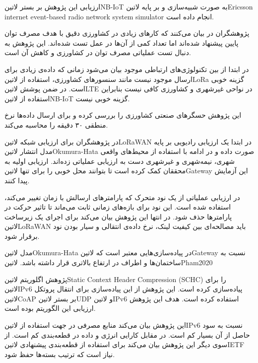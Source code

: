 ارزیابی این پژوهش بر بستر ‌لاتین{NB-IoT} به صورت شبیه‌سازی و بر پایه ‌لاتین{Ericsson internet event-based radio network system simulator} انجام داده است.


پژوهشگران در  بیان می‌کنند که کارهای زیادی در کشاورزی دقیق با هدف مصرف توان پایین پیشنهاد شده‌اند اما تعداد کمی از آن‌ها در عمل تست شده‌اند.
این پژوهش به دنبال تست عملیاتی مصرف توان در کشاورزی و کاهش آن است.

در ابتدا از بین تکنولوژی‌های ارتباطی موجود بیان می‌شود زمانی که داده‌ی زیادی برای ارسال موجود نیست مانند سنسورهای کشاورزی، استفاده از ‌لاتین{LoRa} گزینه خوبی است.
در ضمن پوشش ‌لاتین{LTE} در نواحی غیرشهری و کشاورزی کافی نیست بنابراین استفاده از ‌لاتین{NB-IoT} گزینه خوبی نیست.

این پژوهش حسگرهای صنعتی کشاورزی را بررسی کرده و برای ارسال داده‌ها نرخ منطقی ۳۰ دقیقه را محاسبه می‌کند.


در  پژوهشگران برای ارزیابی شبکه ‌لاتین{LoRaWAN} در ابتدا یک ارزیابی رادیویی بر پایه مدل انتشار ‌لاتین{Okumura-Hata} صورت داده
و در ادامه با استفاده از محیط‌های واقعی شهری، نیمه‌شهری و غیرشهری دست به ارزیابی عملیاتی زده‌اند. ارزیابی اولیه به محققان کمک کرده است تا بتوانند محل خوبی را برای
تنها ‌لاتین{Gateway} این آزمایش پیدا کنند.

در ارزیابی عملیاتی از یک نود متحرک که پارامترهای ارسالش با زمان تغییر می‌کند، استفاده شده است. این نود برای بازه‌های زمانی ثابت می‌ماند تا تاثیر حرکت در پارامترها حذف شود.
در انتها این پژوهش بیان می‌کند برای اجرای یک زیرساخت ‌لاتین{LoRaWAN} باید مصالحه‌ای بین کیفیت لینک، نرخ داده‌ی انتقالی و سیار بودن نود برقرار شود.

مدل ‌لاتین{Okumura-Hata} در پیاده‌سازی‌هایی معتبر است که ‌لاتین{Gateway} نسبت به ساختمان‌ها و اطراف در ارتفاع بالاتری قرار داشته باشد.
‌لاتین{Pham2020}


پژوهش 
اگلوریتم ‌لاتین{Static Context Header Compression (SCHC)} را برای ‌لاتین{IPv6} پیاده‌سازی کرده است.
این پژوهش از این پیاده‌سازی برای انتقال پروتکل ‌لاتین{CoAP} بر بستر ‌لاتین{UDP} و ‌لاتین{IPv6} استفاده کرده است.
هدف این پژوهش ارزیابی این الگوریتم بوده است.

این پژوهش بیان می‌کند منابع مصرفی در جهت استفاده از ‌لاتین{IPv6} نسبت به سود حاصل از آن بسیار کم است. در مقابل کارایی انرژی و داده در قطعه‌بندی کم است.
از سوی دیگر این پژوهش بیان می‌کند برای استفاده از قطعه‌بندی پیشنهادی ‌لاتین{IETF} نیاز است که ترتیب بسته‌ها حفظ شود.

